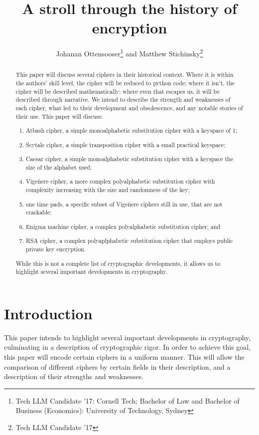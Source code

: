 \documentclass{AIAA}
\begin{document}
\title{A stroll through the history of encryption}

\author{Johanan Ottensooser\footnote{Tech LLM Candidate '17: Cornell Tech; Bachelor of Law and Bachelor of Business (Economics): University of Technology, Sydney} and Matthew Stichinsky\footnote{Tech LLM Candidate '17}}

\begin{abstract}
This paper will discuss several ciphers in their historical context. Where it is within the authors' skill level, the cipher will be reduced to python code; where it isn't, the cipher will be described mathematically; where even that escapes us, it will be described through narrative. We intend to describe the strength and weaknesses of each cipher, what led to their development and obsolescence, and any notable stories of their use. 
This paper will discuss:
\begin{enumerate}
\item Atbash cipher, a simple monoalphabetic substitution cipher with a keyspace of 1;
\item Scytale cipher, a simple transposition cipher with a small practical keyspace;
\item Caesar cipher, a simple monoalphabetic substitution cipher with a keyspace the size of the alphabet used;
\item Vige\`nere cipher, a more complex polyalphabetic substitution cipher with complexity increasing with the size and randomness of the key;
\item one time pads, a specific subset of Vige\`nere ciphers still in use, that are not crackable;
\item Enigma machine cipher, a complex polyalphabetic substitution cipher; and
\item RSA cipher, a complex polyaplphabetic substitution cipher that employs public private key encryption.
\end{enumerate}
While this is not a complete list of cryptographic developments, it allows us to highlight several important developments in cryptography.
\end{abstract}

\maketitle

\section{Introduction}
This paper intends to highlight several important developments in cryptography, culminating in a description of cryptographic rigor. In order to achieve this goal, this paper will encode certain ciphers in a uniform manner. This will allow the comparison of different ciphers by certain fields in their description, and a description of their strengths and weaknesses. 
\end{document}

